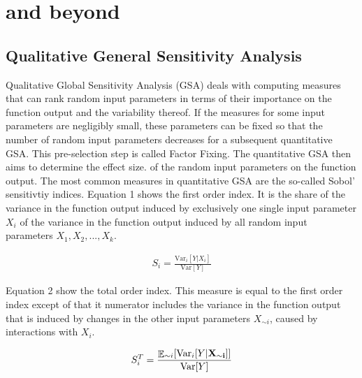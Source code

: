 \documentclass[a4paper,12pt]{article}
\DeclareMathOperator*{\E}{\mathbb{E}}
\begin{document}
\newpage %

\section{\cite{ge2017extending} and beyond}
\thispagestyle{plain} %


\cite{Saltelli.2008}

\cite{lemaire2013structural}

\cite{gentle2006random}

\cite{ge2017extending}

\cite{Smith.2014}

\subsection{Qualitative General Sensitivity Analysis}
\noindent
Qualitative Global Sensitivity Analysis (GSA) deals with computing measures that can rank random input parameters in terms of their importance on the function output and the variability thereof. If the measures for some input parameters are negligibly small, these parameters can be fixed so that the number of random input parameters decreases for a subsequent quantitative GSA. This pre-selection step is called Factor Fixing. The quantitative GSA then aims to determine the effect size. of the random input parameters on the function output. The most common measures in quantitative GSA are the so-called Sobol' sensitivtiy indices. Equation 1 shows the first order index. It is the share of the variance in the function output induced by exclusively one single input parameter $X_i$ of the variance in the function output induced by all random input parameters $X_1, X_2, ..., X_k$.

\begin{align}
S_i = \frac{\text{Var}_i[Y|X_i ]}{\text{Var}[Y]}
\end{align}

Equation 2 show the total order index. This measure is equal to the first order index except of that it numerator includes the variance in the function output that is induced by changes in the other input parameters $X_{\sim i}$, caused by interactions with $X_i$.

\begin{align}
S_{i}^T = \frac{\E_{\sim i}[\text{Var}_{i}[Y|\bold{X_{\sim i}]]}}{\text{Var}[Y]}
\end{align}
\end{document}
